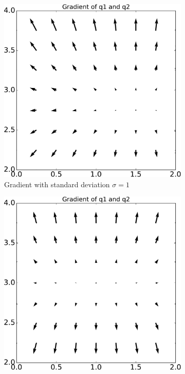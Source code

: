 \begin{figure}
	\centering
	\begin{subfigure}{.5\textwidth}
		\centering
		\includegraphics[width=\textwidth]{simple-linear-system/figures/gradient_2d_narrow_prior}
		\caption{Gradient with standard deviation $\sigma = 1$}
		\label{fig:linear_system.prior_influence.narrow}
	\end{subfigure}%
	\begin{subfigure}{.5\textwidth}
		\centering
		\includegraphics[width=\textwidth]{simple-linear-system/figures/gradient_2d_wide_prior}

\end{subfigure}
\end{figure}
